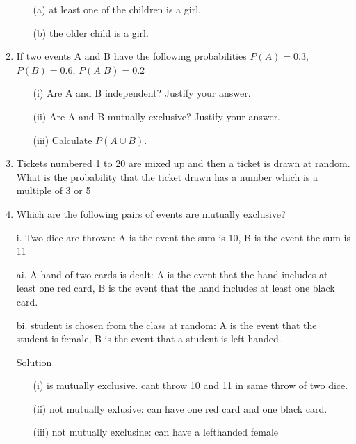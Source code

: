 \documentclass[a4paper,12pt]{article}
\begin{document}
\begin{enumerate}
\begin{itemize}
\item[(a)] at least one of the children is a girl,
\item[(b)] the older child is a girl. 
\end{itemize}

\item 
If two events A and B have the following probabilities $P(A) = 0.3$, $P(B) = 0.6$, $P(A|B) = 0.2$

\begin{itemize}
\item[(i)] Are A and B independent? Justify your answer.
\item[(ii)] Are A and B mutually exclusive? Justify your answer.
\item[(iii)] Calculate $P(A \cup B)$.
\end{itemize}





\item Tickets numbered 1 to 20 are mixed up and then a ticket is drawn at random. What is the probability that the ticket drawn has a number which is a multiple of 3 or 5

\item 
Which are the following pairs of events are mutually exclusive?

i.
Two dice are thrown: A is the event the sum is 10, B is the event the sum is 11


ai.
A hand of two cards is dealt: A is the event that the hand includes at least one red card, B is the event that the hand includes at least one black card.


bi.
student is chosen from the class at random: A is the event that the student is female, B is the event that a student is left-handed.






\begin{framed}


Solution

\begin{itemize}
\item[(i)] is mutually exclusive. cant throw 10 and 11 in same throw of two dice.


\item[(ii)] not mutually exlusive: can have one red card and one black card.


\item[(iii)] not mutually exclusine: can have a lefthanded female
\end{itemize}
\end{framed}


\end{enumerate}
\end{document}
